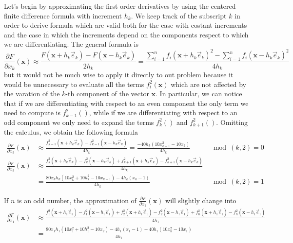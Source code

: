 Let's begin by approximating the first order derivatives by using the centered finite difference formula with increment $h_k$. We keep track of the subscript $k$ in order to derive formula which are valid both for the case with costant increments and the case in which the increments depend on the components respect to which we are differentiating.
The general formula is
$$ \frac{\partial F }{\partial x_k} (\mathbf{x}) \approx \frac{F(\mathbf{x} + h_k \vec{e}_k) - F(\mathbf{x} - h_k \vec{e}_k)}{2h_k} = 
\frac{\sum_{i = 1}^{n} f_i(\mathbf{x} + h_k \vec{e}_k)^2 - \sum_{i = 1}^{n} f_i(\mathbf{x} - h_k \vec{e}_k)^2}{4h_k}$$
but it would not be much wise to apply it directly to out problem because it would be unnecessary to evaluate all the terms $f_i^2(\mathbf{x})$ which are not affected by the varation of the $k$-th component of the vector $\mathbf{x}$.
In particular, we can notice that if we are differentiating with respect to an even component the only term we need to compute is $f_{k-1}^2()$, while if we are differentiating with respect to an odd component we only need to expand the terms $f_k^2()$ and $f_{k+1}^2()$.
Omitting the calculus, we obtain the following formula
\begin{align*}
    \frac{\partial F}{\partial x_k} (\mathbf{x}) &\approx \frac{f_{k-1}^2(\mathbf{x} + h_k \vec{e}_k) - f_{k-1}^2(\mathbf{x} - h_k \vec{e}_k)}{4h_k} = \frac{- 40h_k (10x_{k-1}^2 - 10x_k)}{4h_k} \quad  &\mod(k,2)  = 0 \\
    \frac{\partial F}{\partial x_k} (\mathbf{x}) &\approx \frac{f_{k}^2(\mathbf{x} + h_k \vec{e}_k) - f_{k}^2(\mathbf{x} - h_k \vec{e}_k) + f_{k+1}^2(\mathbf{x} + h_k \vec{e}_k) - f_{k+1}^2(\mathbf{x} - h_k \vec{e}_k)}{4h_k} \\ &= \frac{80x_k h_k (10x_k^2 + 10 h_k^2 -10x_{k+1}) - 4h_k (x_k -1)}{4h_k} \quad &\mod(k,2) = 1
\end{align*}

If $n$ is an odd number, the approximation of $\frac{\partial F}{\partial x_1} (\mathbf{x})$ will slightly change into 
\begin{align*}
\frac{\partial F}{\partial x_1} (\mathbf{x}) & \approx  \frac{f_{1}^2(\mathbf{x} + h_1 \vec{e}_1) - f_{1}^2(\mathbf{x} - h_1 \vec{e}_1) + f_{2}^2(\mathbf{x} + h_1 \vec{e}_1) - f_{2}^2(\mathbf{x} - h_1 \vec{e}_1) + f_n^2(\mathbf{x} + h_1 \vec{e}_1) - f_n^2(\mathbf{x} - h_1\vec{e}_1)}{4h_1} \\ &
 = \frac{80x_1 h_1(10x_1^2 + 10 h_1^2 -10x_{2}) - 4h_1 (x_1 -1) -40h_1 (10x_n^2 - 10x_1) }{4h_1}
\end{align*}

